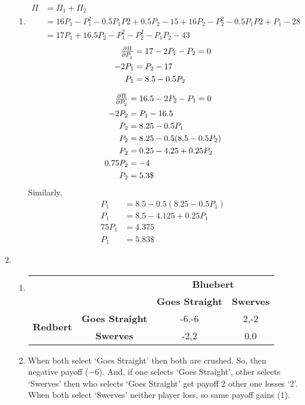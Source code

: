 \documentclass[a4paper,12pt]{article}
\begin{document}
\begin{enumerate}
\begin{enumerate}
\item
\begin{align*}
\Pi &= \Pi_1+\Pi_2\\
&= 16P_1-P_1^2-0.5P_1P2+0.5P_2-15+16P_2-P_2^2-0.5P_1P2+P_1-28\\
&=17P_1+16.5P_2-P_1^2-P_2^2-P_1P_2-43
\end{align*}
\begin{align*}
\pd{\Pi}{P_1} &= 17-2P_1-P_2=0\\
-2P_1 &= P_2-17\\
P_1 &= 8.5-0.5P_2
\end{align*}

\begin{align*}
\pd{\Pi}{P_2} &= 16.5-2P_2-P_1=0\\
-2P_2 &= P_1-16.5\\
P_2 &= 8.25-0.5P_1\\
P_2 &= 8.25-0.5(8.5-0.5P_2)\\
P_2 &= 0.25-4.25+0.25P_2\\
0.75P_2 & = -4\\
P_2 &= 5.3\$
\end{align*}
Similarly, 
\begin{align*}
P_1 &= 8.5-0.5(8.25-0.5P_1)\\
P_1 &= 8.5-4.125+0.25P_1\\
75P_1 &= 4.375\\
P_1 &= 5.83\$
\end{align*}
\end{enumerate}

\item%
\begin{enumerate}
\item
\begin{table}[H]
\centering
\begin{tabular}{@{}cccc@{}}
\toprule
\multicolumn{2}{c}{} & \multicolumn{2}{c}{\bfseries Bluebert}\\
\multicolumn{2}{c}{} & \textbf{Goes Straight} & \textbf{Swerves}\\
\multirow{2}{*}{\bfseries Redbert} & \textbf{Goes Straight} & -6,-6 & 2,-2\\
 & \textbf{Swerves} & -2,2 & 0,0\\
\bottomrule
\end{tabular}
\end{table}

\item
When both select `Goes Straight' then both are crushed. So, then negative payoff ($-6$). And, if one selects `Goes Straight', other selects `Swerves' then who selects `Goes Straight' get payoff $2$ other one losses `2'. When both select `Swerves' neither player loss, so same payoff gains ($1$).


\end{enumerate}
\end{enumerate}
\end{document}
